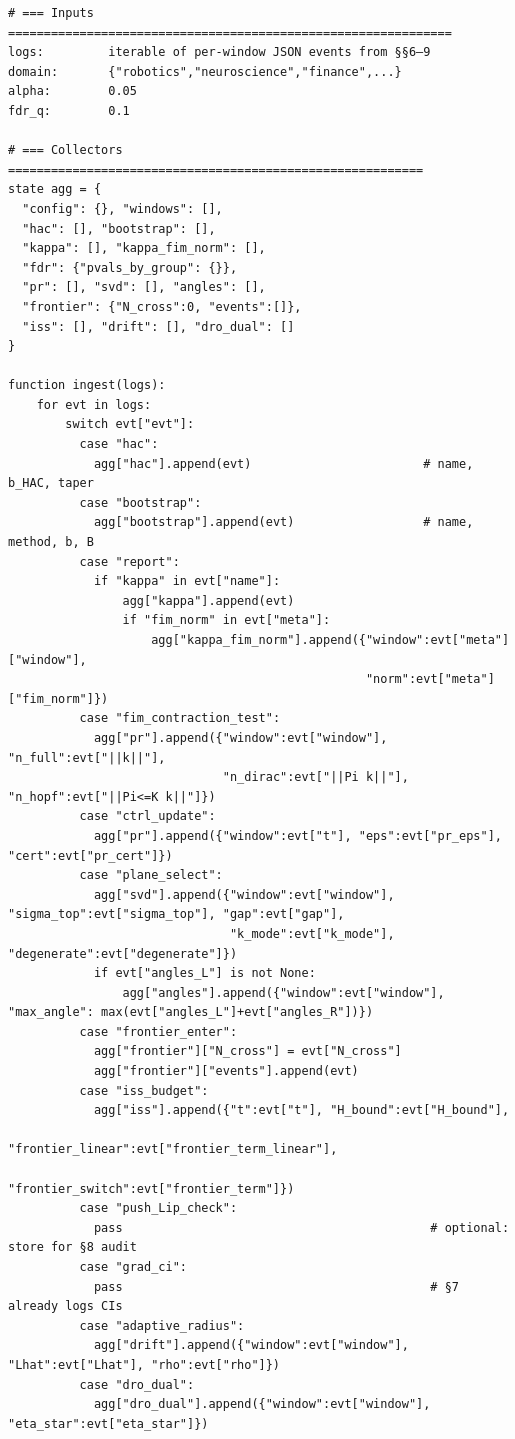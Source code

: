 \documentclass[10pt]{article}
\begin{document}
\begin{lstlisting}
# === Inputs ==============================================================
logs:         iterable of per-window JSON events from §§6–9
domain:       {"robotics","neuroscience","finance",...}
alpha:        0.05
fdr_q:        0.1

# === Collectors ==========================================================
state agg = {
  "config": {}, "windows": [],
  "hac": [], "bootstrap": [],
  "kappa": [], "kappa_fim_norm": [],
  "fdr": {"pvals_by_group": {}},
  "pr": [], "svd": [], "angles": [],
  "frontier": {"N_cross":0, "events":[]},
  "iss": [], "drift": [], "dro_dual": []
}

function ingest(logs):
    for evt in logs:
        switch evt["evt"]:
          case "hac":
            agg["hac"].append(evt)                        # name, b_HAC, taper
          case "bootstrap":
            agg["bootstrap"].append(evt)                  # name, method, b, B
          case "report":
            if "kappa" in evt["name"]:
                agg["kappa"].append(evt)
                if "fim_norm" in evt["meta"]:
                    agg["kappa_fim_norm"].append({"window":evt["meta"]["window"],
                                                  "norm":evt["meta"]["fim_norm"]})
          case "fim_contraction_test":
            agg["pr"].append({"window":evt["window"], "n_full":evt["||k||"],
                              "n_dirac":evt["||Pi k||"], "n_hopf":evt["||Pi<=K k||"]})
          case "ctrl_update":
            agg["pr"].append({"window":evt["t"], "eps":evt["pr_eps"], "cert":evt["pr_cert"]})
          case "plane_select":
            agg["svd"].append({"window":evt["window"], "sigma_top":evt["sigma_top"], "gap":evt["gap"],
                               "k_mode":evt["k_mode"], "degenerate":evt["degenerate"]})
            if evt["angles_L"] is not None:
                agg["angles"].append({"window":evt["window"], "max_angle": max(evt["angles_L"]+evt["angles_R"])})
          case "frontier_enter":
            agg["frontier"]["N_cross"] = evt["N_cross"]
            agg["frontier"]["events"].append(evt)
          case "iss_budget":
            agg["iss"].append({"t":evt["t"], "H_bound":evt["H_bound"],
                               "frontier_linear":evt["frontier_term_linear"],
                               "frontier_switch":evt["frontier_term"]})
          case "push_Lip_check":
            pass                                           # optional: store for §8 audit
          case "grad_ci":
            pass                                           # §7 already logs CIs
          case "adaptive_radius":
            agg["drift"].append({"window":evt["window"], "Lhat":evt["Lhat"], "rho":evt["rho"]})
          case "dro_dual":
            agg["dro_dual"].append({"window":evt["window"], "eta_star":evt["eta_star"]})


\end{lstlisting}
\end{document}
